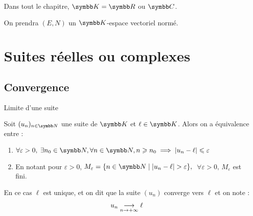 
Dans tout le chapitre, $\K = \R$ ou $\C$.

On prendra $(E, N)$ un $\K$-espace vectoriel normé.

\section{Suites réelles ou complexes}
\subsection{Convergence}
\begin{definition}{Limite d'une suite}{}

    Soit $(u_n)_{n\in\N}$ une suite de $\K$ et $\ell \in \K$. Alors on a équivalence entre : 

    \begin{enumerate}[label=(\roman*)]
        \item $\forall \varepsilon > 0, \; \exists n_0 \in \N, \forall n \in \N, n \geqslant n_0 \implies |u_n - \ell| \leqslant \varepsilon$

        \item En notant pour $\varepsilon > 0$, $M_\varepsilon = \{n \in \N \mid |u_n - \ell| > \varepsilon\},$ 
        $\; \forall \varepsilon > 0, \, M_\varepsilon$ est fini.
    \end{enumerate}
    

    En ce cas $\ell$ est unique, et on dit que la suite $(u_n)$ converge vers $\ell$ et on note  :
    \[u_n \underset{n \to +\infty}{\longrightarrow} \ell\]
\end{definition}


